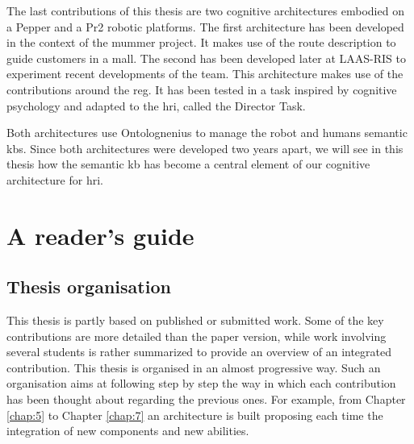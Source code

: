 The last contributions of this thesis are two cognitive architectures embodied on a Pepper and a Pr2 robotic platforms. The first architecture has been developed in the context of the \acrlong{mummer} project. It makes use of the route description to guide customers in a mall. The second has been developed later at LAAS-RIS to experiment recent developments of the team. This architecture makes use of the contributions around the \acrlong{reg}. It has been tested in a task inspired by cognitive psychology and adapted to the \acrlong{hri}, called the Director Task.

Both architectures use Ontolognenius to manage the robot and humans semantic \acrshort{kb}s. Since both architectures were developed two years apart, we will see in this thesis how the semantic \acrlong{kb} has become a central element of our cognitive architecture for \acrlong{hri}.

\section{A reader's guide}

\subsection*{Thesis organisation}

This thesis is partly based on published or submitted work. Some of the key contributions are more detailed than the paper version, while work involving several students is rather summarized to provide an overview of an integrated contribution.
This thesis is organised in an almost progressive way. Such an organisation aims at following step by step the way in which each contribution has been thought about regarding the previous ones. For example, from Chapter \ref{chap:5} to Chapter \ref{chap:7} an architecture is built proposing each time the integration of new components and new abilities. 

